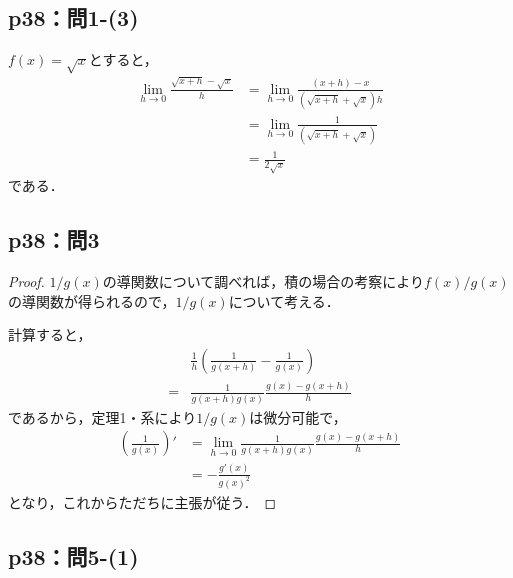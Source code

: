 \documentclass[uplatex,dvipdfmx,a4paper,10pt,fleqn]{jsarticle}
\begin{document}
\subsection*{p38：問1-(3)}

\begin{tleftbar}
    $f(x)= \sqrt{x}$とすると，
    \begin{align*} 
        \lim_{h \to 0} \frac{\sqrt{x+h}-\sqrt{x}}{h} & = \lim_{h \to 0} \frac{(x+h)-x}{(\sqrt{x+h}+\sqrt{x})h} \\
        & =  \lim_{h \to 0} \frac{1}{(\sqrt{x+h}+\sqrt{x})} \\
        & = \frac{1}{2\sqrt{x}}
    \end{align*} 
    である．
\end{tleftbar}


\subsection*{p38：問3}

\begin{tleftbar}
    \begin{proof}
        $1 /g(x)$の導関数について調べれば，積の場合の考察により$ f(x)/g(x)$の導関数が得られるので，$1/g(x)$について考える．

        計算すると，
        \begin{align*} 
           & \frac{1}{h} \left (\frac{1}{g(x+h)}-\frac{1}{g(x)} \right) \\
           =& \frac{1}{g(x+h)g(x)} \frac{g(x)-g(x+h)}{h}
        \end{align*} 
        であるから，定理1・系により$ 1/g(x)$は微分可能で，
        \begin{align*}
            \left ( \frac{1}{g(x)} \right) ' &= \lim_{h \to 0} \frac{1}{g(x+h)g(x)} \frac{g(x)-g(x+h)}{h} \\
            & = -\frac{g'(x)}{{g(x)}^2}
        \end{align*}
        となり，これからただちに主張が従う．
    \end{proof}
\end{tleftbar}

\subsection*{p38：問5-(1)}
\end{document}
